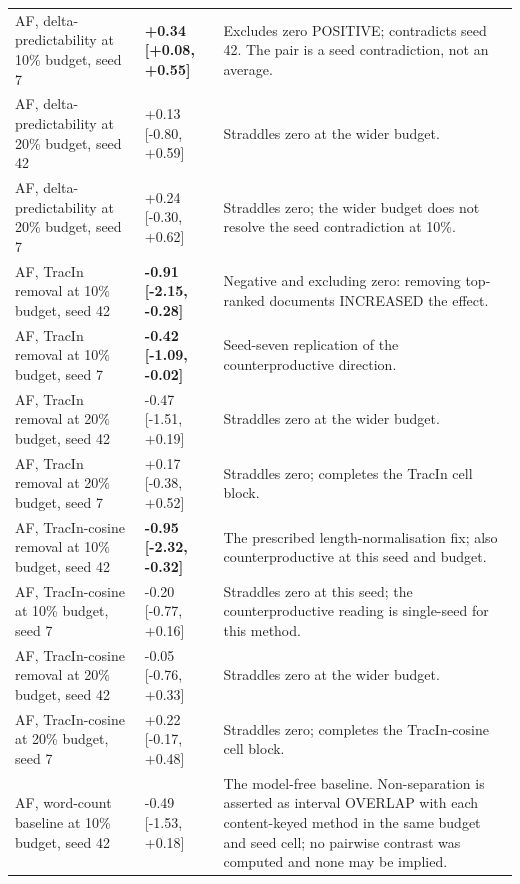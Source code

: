 \documentclass[10pt]{article}
\begin{document}
{\begin{longtable}{ p{4.47cm}lp{8.33cm} }
AF, delta-predictability at 10\% budget, seed 7 & \textbf{ +0.34 [+0.08, +0.55] } & Excludes zero POSITIVE; contradicts seed 42. The pair is a seed contradiction, not an average. \\

AF, delta-predictability at 20\% budget, seed 42 & +0.13 [-0.80, +0.59] & Straddles zero at the wider budget. \\

AF, delta-predictability at 20\% budget, seed 7 & +0.24 [-0.30, +0.62] & Straddles zero; the wider budget does not resolve the seed contradiction at 10\%. \\

AF, TracIn removal at 10\% budget, seed 42 & \textbf{ -0.91 [-2.15, -0.28] } & Negative and excluding zero: removing top-ranked documents INCREASED the effect. \\

AF, TracIn removal at 10\% budget, seed 7 & \textbf{ -0.42 [-1.09, -0.02] } & Seed-seven replication of the counterproductive direction. \\

AF, TracIn removal at 20\% budget, seed 42 & -0.47 [-1.51, +0.19] & Straddles zero at the wider budget. \\

AF, TracIn removal at 20\% budget, seed 7 & +0.17 [-0.38, +0.52] & Straddles zero; completes the TracIn cell block. \\

AF, TracIn-cosine removal at 10\% budget, seed 42 & \textbf{ -0.95 [-2.32, -0.32] } & The prescribed length-normalisation fix; also counterproductive at this seed and budget. \\

AF, TracIn-cosine at 10\% budget, seed 7 & -0.20 [-0.77, +0.16] & Straddles zero at this seed; the counterproductive reading is single-seed for this method. \\

AF, TracIn-cosine removal at 20\% budget, seed 42 & -0.05 [-0.76, +0.33] & Straddles zero at the wider budget. \\

AF, TracIn-cosine at 20\% budget, seed 7 & +0.22 [-0.17, +0.48] & Straddles zero; completes the TracIn-cosine cell block. \\

AF, word-count baseline at 10\% budget, seed 42 & -0.49 [-1.53, +0.18] & The model-free baseline. Non-separation is asserted as interval OVERLAP with each content-keyed method in the same budget and seed cell; no pairwise contrast was computed and none may be implied. \\


\end{longtable}}
\end{document}
